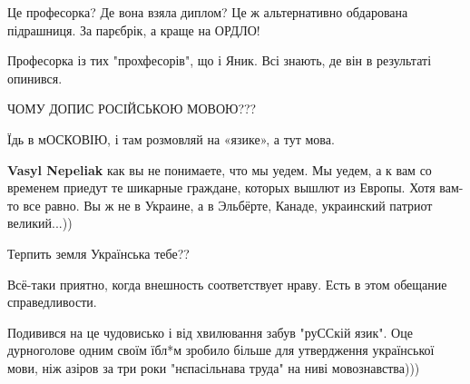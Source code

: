 \begin{itemize}

Це професорка? Де вона взяла диплом? Це ж альтернативно обдарована підрашниця. За парєбрік, а краще на ОРДЛО!


Професорка із тих "прохфесорів", що і Яник. Всі знають, де він в результаті опинився.


ЧОМУ ДОПИС РОСІЙСЬКОЮ МОВОЮ???


Їдь в мОСКОВІЮ, і там розмовляй на «язике», а тут мова.

\begin{itemize}

\textbf{Vasyl Nepeliak} как вы не понимаете, что мы уедем. Мы уедем, а к вам со временем приедут те шикарные граждане, которых вышлют из Европы. Хотя вам-то все равно. Вы ж не в Украине, а в Эльбёрте, Канаде, украинский патриот великий...))
\end{itemize}


Терпить земля Українська тебе??


Всё-таки приятно, когда внешность соответствует нраву. Есть в этом обещание справедливости.


Подивився на це чудовисько і від хвилювання забув "руССкій
язик". Оце дурноголове одним своїм їбл*м зробило більше для утвердження української мови, ніж азіров за три роки "нєпасільнава труда" на ниві мовознавства)))


\end{itemize}
